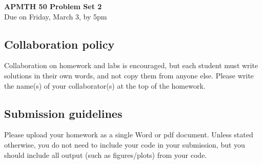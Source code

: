 \documentclass[12pt]{article}
\begin{document}
\begin{center}{\Large \bf{APMTH 50 Problem Set 2}} \vspace{0.2in}\\
{\large Due on Friday, March 3, by 5pm\\}
\end{center}

\subsection*{Collaboration policy}
Collaboration on homework and labs is
encouraged, but each student must write solutions in their own words, and not
copy them from anyone else.  Please write the name(s) of your collaborator(s) at the top of the homework.

\subsection*{Submission guidelines} Please upload your homework as a single Word or pdf document.   Unless stated otherwise, you do not need to include your code in your submission, but you should include all output (such as figures/plots) from your code. 

\end{document}
